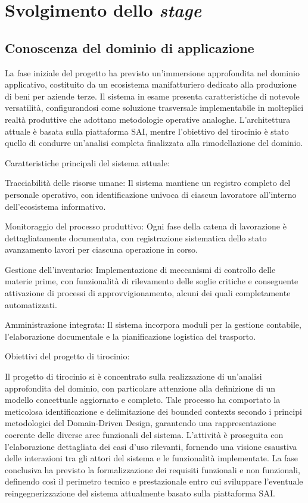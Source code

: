 \chapter{Svolgimento dello \textit{stage}}
    \section{Conoscenza del dominio di applicazione}
    La fase iniziale del progetto ha previsto un'immersione approfondita nel dominio applicativo, costituito da un ecosistema manifatturiero dedicato alla produzione di beni per aziende terze. Il sistema in esame presenta caratteristiche di notevole versatilità, configurandosi come soluzione trasversale implementabile in molteplici realtà produttive che adottano metodologie operative analoghe. L'architettura attuale è basata sulla piattaforma SAI, mentre l'obiettivo del tirocinio è stato quello di condurre un'analisi completa finalizzata alla rimodellazione del dominio.
    
    Caratteristiche principali del sistema attuale:

    Tracciabilità delle risorse umane: Il sistema mantiene un registro completo del personale operativo, con identificazione univoca di ciascun lavoratore all'interno dell'ecosistema informativo.

    Monitoraggio del processo produttivo: Ogni fase della catena di lavorazione è dettagliatamente documentata, con registrazione sistematica dello stato avanzamento lavori per ciascuna operazione in corso.

    Gestione dell'inventario: Implementazione di meccanismi di controllo delle materie prime, con funzionalità di rilevamento delle soglie critiche e conseguente attivazione di processi di approvvigionamento, alcuni dei quali completamente automatizzati.

    Amministrazione integrata: Il sistema incorpora moduli per la gestione contabile, l'elaborazione documentale e la pianificazione logistica del trasporto.

    Obiettivi del progetto di tirocinio:

    Il progetto di tirocinio si è concentrato sulla realizzazione di un'analisi approfondita del dominio, con particolare attenzione alla definizione di un modello concettuale aggiornato e completo. Tale processo ha comportato la meticolosa identificazione e delimitazione dei bounded contexts secondo i principi metodologici del Domain-Driven Design, garantendo una rappresentazione coerente delle diverse aree funzionali del sistema. L'attività è proseguita con l'elaborazione dettagliata dei casi d'uso rilevanti, fornendo una visione esaustiva delle interazioni tra gli attori del sistema e le funzionalità implementate. La fase conclusiva ha previsto la formalizzazione dei requisiti funzionali e non funzionali, definendo così il perimetro tecnico e prestazionale entro cui sviluppare l'eventuale reingegnerizzazione del sistema attualmente basato sulla piattaforma SAI. 

